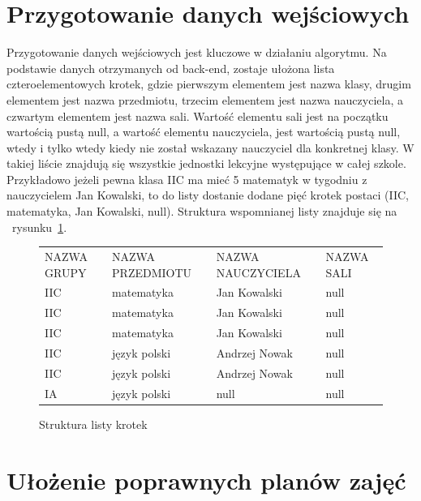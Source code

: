 \section{Przygotowanie danych wejściowych}
    
    Przygotowanie danych wejściowych jest kluczowe w działaniu algorytmu. Na podstawie danych otrzymanych od back-end, zostaje ułożona lista czteroelementowych krotek, gdzie pierwszym elementem jest nazwa klasy, drugim elementem jest nazwa przedmiotu, trzecim elementem jest nazwa nauczyciela, a czwartym elementem jest nazwa sali. Wartość elementu sali jest na początku wartością pustą null, a wartość elementu nauczyciela, jest wartością pustą null, wtedy i tylko wtedy kiedy nie został wskazany nauczyciel dla konkretnej klasy. W takiej liście znajdują się wszystkie jednostki lekcyjne występujące w całej szkole. Przykładowo jeżeli pewna klasa IIC ma mieć 5 matematyk w tygodniu z nauczycielem Jan Kowalski, to do listy dostanie dodane pięć krotek postaci (IIC, matematyka, Jan Kowalski, null). Struktura wspomnianej listy znajduje się na ~rysunku~\ref{rys:krotki}.


\begin{figure}[h]
\begin{tabular}{llll}
NAZWA GRUPY & NAZWA PRZEDMIOTU & NAZWA NAUCZYCIELA & NAZWA SALI \\
IIC         & matematyka       & Jan Kowalski      & null       \\
IIC         & matematyka       & Jan Kowalski      & null       \\
IIC         & matematyka       & Jan Kowalski      & null       \\
IIC         & język polski     & Andrzej Nowak     & null       \\
IIC         & język polski     & Andrzej Nowak     & null       \\
IA          & język polski     & null              & null      
\end{tabular}
\caption{Struktura listy krotek} \label{rys:krotki}
\end{figure}

\section{Ułożenie poprawnych planów zajęć}

